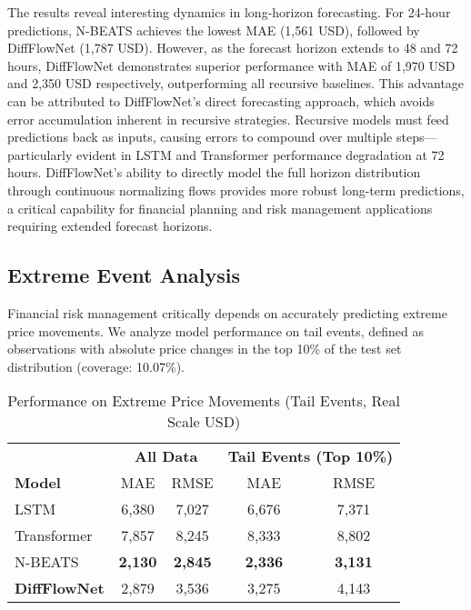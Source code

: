 \documentclass[11pt,a4paper]{article}
\begin{document}
The results reveal interesting dynamics in long-horizon forecasting. For 24-hour predictions, N-BEATS achieves the lowest MAE (1,561 USD), followed by DiffFlowNet (1,787 USD). However, as the forecast horizon extends to 48 and 72 hours, DiffFlowNet demonstrates superior performance with MAE of 1,970 USD and 2,350 USD respectively, outperforming all recursive baselines. This advantage can be attributed to DiffFlowNet's direct forecasting approach, which avoids error accumulation inherent in recursive strategies. Recursive models must feed predictions back as inputs, causing errors to compound over multiple steps—particularly evident in LSTM and Transformer performance degradation at 72 hours. DiffFlowNet's ability to directly model the full horizon distribution through continuous normalizing flows provides more robust long-term predictions, a critical capability for financial planning and risk management applications requiring extended forecast horizons.

\subsection{Extreme Event Analysis}

Financial risk management critically depends on accurately predicting extreme price movements. We analyze model performance on tail events, defined as observations with absolute price changes in the top 10\% of the test set distribution (coverage: 10.07\%).

\begin{table}[htbp]
\centering
\caption{Performance on Extreme Price Movements (Tail Events, Real Scale USD)}
\label{tab:tail_events}
\begin{tabular}{lcccc}
\toprule
& \multicolumn{2}{c}{\textbf{All Data}} & \multicolumn{2}{c}{\textbf{Tail Events (Top 10\%)}} \\
\cmidrule(lr){2-3} \cmidrule(lr){4-5}
\textbf{Model} & MAE & RMSE & MAE & RMSE \\
\midrule
LSTM & 6,380 & 7,027 & 6,676 & 7,371 \\
Transformer & 7,857 & 8,245 & 8,333 & 8,802 \\
N-BEATS & \textbf{2,130} & \textbf{2,845} & \textbf{2,336} & \textbf{3,131} \\
\midrule
\textbf{DiffFlowNet} & 2,879 & 3,536 & 3,275 & 4,143 \\
\bottomrule
\end{tabular}
\end{table}
\end{document}
